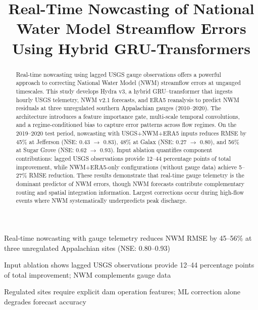 \documentclass[draft]{agujournal2019}
\begin{document}
\title{Real-Time Nowcasting of National Water Model Streamflow Errors Using Hybrid GRU-Transformers}




\begin{keypoints}
\item Real-time nowcasting with gauge telemetry reduces NWM RMSE by 45--56\% at three unregulated Appalachian sites (NSE: 0.80--0.93)
\item Input ablation shows lagged USGS observations provide 12--44 percentage points of total improvement; NWM complements gauge data
\item Regulated sites require explicit dam operation features; ML correction alone degrades forecast accuracy
\end{keypoints}

\begin{abstract}
Real-time nowcasting using lagged USGS gauge observations offers a powerful approach to correcting National Water Model (NWM) streamflow errors at ungauged timescales. This study develops Hydra v3, a hybrid GRU--transformer that ingests hourly USGS telemetry, NWM v2.1 forecasts, and ERA5 reanalysis to predict NWM residuals at three unregulated southern Appalachian gauges (2010--2020). The architecture introduces a feature importance gate, multi-scale temporal convolutions, and a regime-conditioned bias to capture error patterns across flow regimes. On the 2019--2020 test period, nowcasting with USGS+NWM+ERA5 inputs reduces RMSE by 45\% at Jefferson (NSE: 0.43 $\to$ 0.83), 48\% at Galax (NSE: 0.27 $\to$ 0.80), and 56\% at Sugar Grove (NSE: 0.62 $\to$ 0.93). Input ablation quantifies component contributions: lagged USGS observations provide 12--44 percentage points of total improvement, while NWM+ERA5-only configurations (without gauge data) achieve 5--27\% RMSE reduction. These results demonstrate that real-time gauge telemetry is the dominant predictor of NWM errors, though NWM forecasts contribute complementary routing and spatial integration information. Largest corrections occur during high-flow events where NWM systematically underpredicts peak discharge.
\end{abstract}
\end{document}
